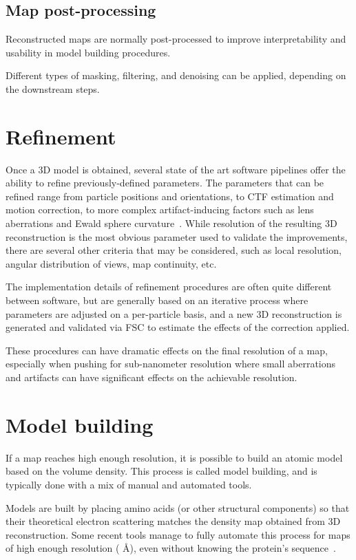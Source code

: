 \subsection{Map post-processing}
Reconstructed maps are normally post-processed to improve interpretability and usability in model building procedures.

Different types of masking, filtering, and denoising can be applied, depending on the downstream steps.

\section{Refinement}\label{em_refinement}
Once a 3D model is obtained, several state of the art software pipelines offer the ability to refine previously-defined parameters.
The parameters that can be refined range from particle positions and orientations, to CTF estimation and motion correction, to more complex artifact-inducing factors such as lens aberrations and Ewald sphere curvature~\cite{tegunovMultiparticleCryoEMRefinement2021,punjaniCryoSPARCAlgorithmsRapid2017,scheresRELIONImplementationBayesian2012}.
While resolution of the resulting 3D reconstruction is the most obvious parameter used to validate the improvements, there are several other criteria that may be considered, such as local resolution, angular distribution of views, map continuity, etc.

The implementation details of refinement procedures are often quite different between software, but are generally based on an iterative process where parameters are adjusted on a per-particle basis, and a new 3D reconstruction is generated and validated via FSC to estimate the effects of the correction applied.

These procedures can have dramatic effects on the final resolution of a map, especially when pushing for sub-nanometer resolution where small aberrations and artifacts can have significant effects on the achievable resolution.

\section{Model building}

If a map reaches high enough resolution, it is possible to build an atomic model based on the volume density.
This process is called model building, and is typically done with a mix of manual and automated tools.

Models are built by placing amino acids (or other structural components) so that their theoretical electron scattering matches the density map obtained from 3D reconstruction.
Some recent tools manage to fully automate this process for maps of high enough resolution ( Å), even without knowing the protein's sequence~\cite{jamaliAutomatedModelBuilding2024}.
